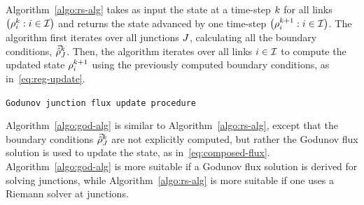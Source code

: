 												
						Algorithm~\ref{algo:rs-alg} takes as input the state at a time-step
						$k$ for all links $\left(\discrete{\link}{\tind}:\link\in\links\right)$
						and returns the state advanced by one time-step $\left(\discrete{\link}{\tind+1}:\link\in\links\right)$.
						The algorithm first iterates over all junctions $J$, calculating
						all the boundary conditions, $\vec{\hat{\rho}}_{J}^{k}$. Then, the
						algorithm iterates over all links $i\in\mathcal{I}$ to compute the
						updated state $\rho_{i}^{k+1}$ using the previously computed
						boundary conditions, as in~\eqref{eq:reg-update}.
												
						\begin{algorithm}[h]
							\caption{\texttt{Godunov junction flux update procedure}}
														
														
							
						\end{algorithm}
												
												
						Algorithm~\ref{algo:god-alg} is similar to Algorithm~\ref{algo:rs-alg},
						except that the boundary conditions $\vec{\hat{\rho}}_{J}^{k}$ are
						not explicitly computed, but rather the Godunov flux solution is used
						to update the state, as in~\eqref{eq:composed-flux}. Algorithm~\ref{algo:god-alg}
						is more suitable if a Godunov flux solution is derived for solving
						junctions, while Algorithm~\ref{algo:rs-alg} is more suitable if
						one uses a Riemann solver at junctions.

